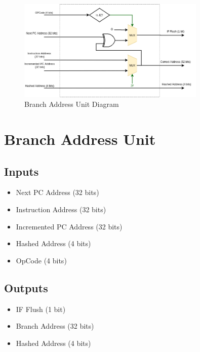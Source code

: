 \documentclass[12pt]{report}
\begin{document}
\begin{center}
    \begin{figure}[hp]
        \centering
        \includegraphics[width=0.8\textwidth]{bau}
        \caption{Branch Address Unit Diagram}
        \label{fig:bau}
    \end{figure}
\end{center}

\section{Branch Address Unit}

\subsection{Inputs}
\begin{itemize}
    \item Next PC Address (32 bits)
    \item Instruction Address (32 bits)
    \item Incremented PC Address (32 bits)
    \item Hashed Address (4 bits)
    \item OpCode (4 bits)
\end{itemize}

\subsection{Outputs}
\begin{itemize}
    \item IF Flush (1 bit)
    \item Branch Address (32 bits)
    \item Hashed Address (4 bits)
\end{itemize}
\end{document}
